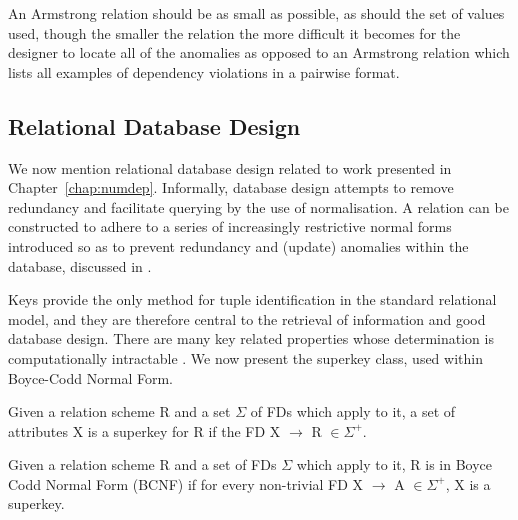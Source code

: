 An Armstrong relation should be as small as possible, as should the
set of values used, though the smaller the relation the more difficult
it becomes for the designer to locate all of the anomalies as opposed
to an Armstrong relation which lists all examples of dependency
violations in a pairwise format.\\ 

\subsection{Relational Database Design}\label{subsec:reldbdes}
			
We now mention relational
database design related to work presented in
Chapter~\ref{chap:numdep}. Informally, database design attempts to
remove redundancy and facilitate querying by the use of normalisation.
A relation can be 
constructed to adhere to a series of increasingly restrictive normal forms introduced so as to prevent redundancy and (update) anomalies within the
database, discussed in
\cite{cod72,databasefound,atze93,Date95,Maier83,Ullm88}.  

\medskip

Keys provide the only method for tuple identification  in the standard
relational model, and they are
therefore central to the retrieval of information and good database design. There are many key
related properties whose determination is computationally intractable
\cite{lo78}. We now present the superkey class, used within Boyce-Codd
Normal Form.

\begin{definition}[SuperKey]
\begin{rm}
Given a relation scheme R and a set  $\Sigma$ of FDs which apply to it, a  set of attributes X is a superkey for R if the FD X $\to$ R $\in \Sigma^+$.
\end{rm}
\end{definition}

\begin{definition}\label{def:bcnf}
\begin{rm}
Given a relation scheme R and a set of FDs $\Sigma$ which apply to it, R is in Boyce Codd Normal Form (BCNF) if for every non-trivial FD X $\to$ A $\in \Sigma^+$, X is a superkey.
\end{rm}
\end{definition}



